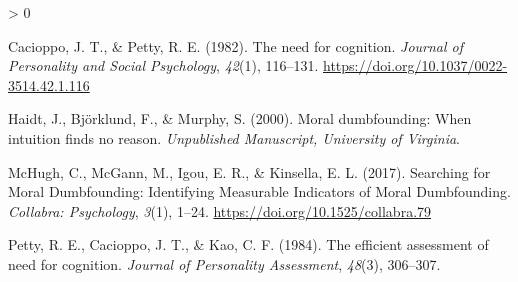 \documentclass[
  american,
  man,floatsintext]{apa7}
\newlength{\cslhangindent}
\newenvironment{CSLReferences}[2] %
 {%
  \setlength{\parindent}{0pt}
  \ifodd #1 \everypar{\setlength{\hangindent}{\cslhangindent}}\ignorespaces\fi
  \ifnum #2 > 0
  \setlength{\parskip}{#2\baselineskip}
  \fi
 }%
 {}
\begin{document}
\hypertarget{refs}{}
\begin{CSLReferences}{1}{0}
\leavevmode\hypertarget{ref-cacioppo_need_1982}{}%
Cacioppo, J. T., \& Petty, R. E. (1982). The need for cognition. \emph{Journal of Personality and Social Psychology}, \emph{42}(1), 116--131. \url{https://doi.org/10.1037/0022-3514.42.1.116}

\leavevmode\hypertarget{ref-haidt_moral_2000}{}%
Haidt, J., Björklund, F., \& Murphy, S. (2000). Moral dumbfounding: When intuition finds no reason. \emph{Unpublished Manuscript, University of Virginia}.

\leavevmode\hypertarget{ref-mchugh_searching_2017a}{}%
McHugh, C., McGann, M., Igou, E. R., \& Kinsella, E. L. (2017). Searching for {Moral Dumbfounding}: Identifying {Measurable Indicators} of {Moral Dumbfounding}. \emph{Collabra: Psychology}, \emph{3}(1), 1--24. \url{https://doi.org/10.1525/collabra.79}

\leavevmode\hypertarget{ref-petty_efficient_1984}{}%
Petty, R. E., Cacioppo, J. T., \& Kao, C. F. (1984). The efficient assessment of need for cognition. \emph{Journal of Personality Assessment}, \emph{48}(3), 306--307.

\end{CSLReferences}
\end{document}
